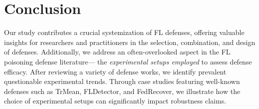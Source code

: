 \section{Conclusion}\label{sec:conclusion}
Our study contributes a crucial systemization of FL defenses, offering valuable insights for researchers and practitioners in the selection, combination, and design of defenses.   
Additionally, we address an often-overlooked aspect in the FL poisoning defense literature— the \emph{experimental setups employed} to assess defense efficacy.  
After reviewing a variety of defense works, we identify prevalent questionable experimental trends. Through case studies featuring well-known defenses such as TrMean, FLDetector, and FedRecover, we illustrate how the choice of experimental setups can significantly impact robustness claims.

\newpage